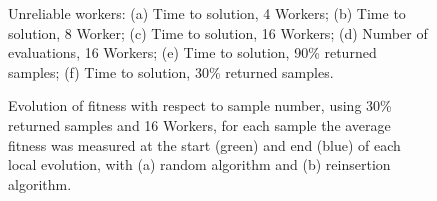 \begin{figure}[t]
{        \label{fig:plot_percent_90}
    }
    \caption{Unreliable workers: (a) Time to solution, 4 Workers; (b) Time to solution, 8 Worker;
    (c) Time to solution, 16 Workers; (d) Number of evaluations, 16 Workers; (e) Time to solution, 90\% returned samples;
    (f) Time to solution, 30\% returned samples. }
    \label{fig:effort_unreliable}
\end{figure}


\begin{figure}[t]
    \centering
    \caption{Evolution of fitness with respect to sample number, using 30\% returned samples and 16 Workers,
    for each sample the average fitness was measured at the start (green) and end (blue) of each local evolution, with (a) random algorithm and
    (b) reinsertion algorithm. }
    \label{fig:effort_unreliable2}
\end{figure}


